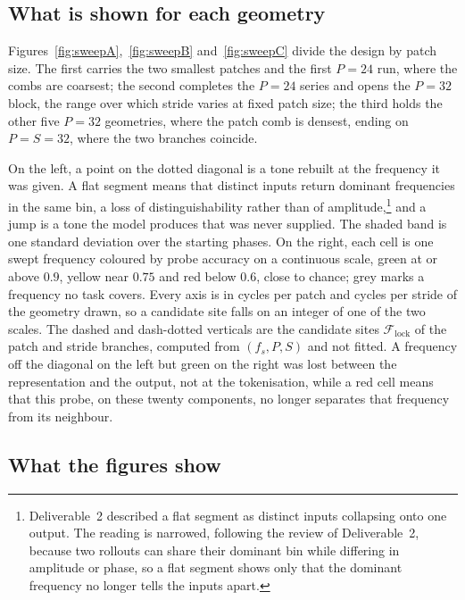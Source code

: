 \subsection{What is shown for each geometry}

Figures~\ref{fig:sweepA},~\ref{fig:sweepB} and~\ref{fig:sweepC} divide the design by patch size. The first carries the two smallest patches and the first $P=24$ run, where the combs are coarsest; the second completes the $P=24$ series and opens the $P=32$ block, the range over which stride varies at fixed patch size; the third holds the other five $P=32$ geometries, where the patch comb is densest, ending on $P=S=32$, where the two branches coincide.

On the left, a point on the dotted diagonal is a tone rebuilt at the frequency it was given. A flat segment means that distinct inputs return dominant frequencies in the same bin, a loss of distinguishability rather than of amplitude,\footnote{Deliverable~2 described a flat segment as distinct inputs collapsing onto one output. The reading is narrowed, following the review of Deliverable~2, because two rollouts can share their dominant bin while differing in amplitude or phase, so a flat segment shows only that the dominant frequency no longer tells the inputs apart.} and a jump is a tone the model produces that was never supplied. The shaded band is one standard deviation over the starting phases. On the right, each cell is one swept frequency coloured by probe accuracy on a continuous scale, green at or above $0.9$, yellow near $0.75$ and red below $0.6$, close to chance; grey marks a frequency no task covers. Every axis is in cycles per patch and cycles per stride of the geometry drawn, so a candidate site falls on an integer of one of the two scales. The dashed and dash-dotted verticals are the candidate sites $\mathcal F_{\mathrm{lock}}$ of the patch and stride branches, computed from $(f_s,P,S)$ and not fitted. A frequency off the diagonal on the left but green on the right was lost between the representation and the output, not at the tokenisation, while a red cell means that this probe, on these twenty components, no longer separates that frequency from its neighbour.

\subsection{What the figures show}

